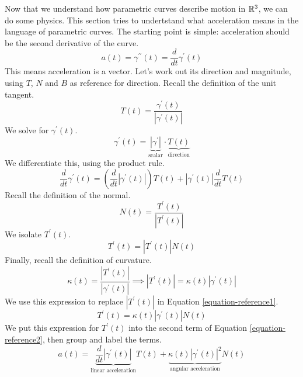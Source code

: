 \documentclass[fleqn,letterpaper]{report}
\begin{document}
Now that we understand how parametric curves describe motion
in $\mathbb{R}^3$, we can do some physics. This section tries to
undertstand what acceleration means in the language of
parametric curves. The starting point is simple: acceleration
should be the second derivative of the curve. 
\begin{equation*}
a(t) = \gamma^{\prime \prime}(t) = \frac{d}{dt}
\gamma^\prime(t) 
\end{equation*}
This means acceleration is a vector. Let's work out its
direction and magnitude, using $T$, $N$ and $B$ as reference
for direction. Recall the definition of the unit tangent.
\begin{equation*}
T(t) = \frac{\gamma^\prime(t)}{|\gamma^\prime(t)|} 
\end{equation*}
We solve for $\gamma^\prime(t)$.
\begin{equation*}
\gamma^\prime(t) = \underbrace{|\gamma^\prime|}_{\text{scalar}} 
\cdot \underbrace{T(t)}_{\text{direction}} 
\end{equation*}
We differentiate this, using the product rule.
\begin{equation}
\label{equation-reference2}
\frac{d}{dt} \gamma^\prime(t) = \left( \frac{d}{dt}
|\gamma^\prime(t)| \right) T(t) + |\gamma^\prime(t)|
\frac{d}{dt} T(t) 
\end{equation}
Recall the definition of the normal.
\begin{equation*}
N(t) = \frac{T^\prime(t)}{|T^\prime(t)|} 
\end{equation*}
We isolate $T^\prime(t)$.
\begin{equation}
\label{equation-reference1}
T^\prime(t) = |T^\prime(t)| N(t) 
\end{equation}
Finally, recall the definition of curvature.
\begin{equation*}
\kappa(t) = \frac{|T^\prime(t)|}{|\gamma^\prime(t)|}
\implies |T^\prime(t)| = \kappa(t) |\gamma^\prime(t)|
\end{equation*}
We use this expression to replace $|T^\prime(t)|$ in Equation
\ref{equation-reference1}.
\begin{equation*}
T^\prime(t) = \kappa(t) |\gamma^\prime(t)| N(t)
\end{equation*}
We put this expression for $T^\prime(t)$ into the second term
of Equation \ref{equation-reference2}, then group and label the
terms.
\begin{equation*}
a(t) = \underbrace{\frac{d}{dt}
|\gamma^\prime(t)|}_{\text{linear acceleration}} T(t) +
\underbrace{\kappa(t) |\gamma^\prime(t)|^2}_{\text{angular
acceleration}} N(t) 
\end{equation*}
\end{document}
